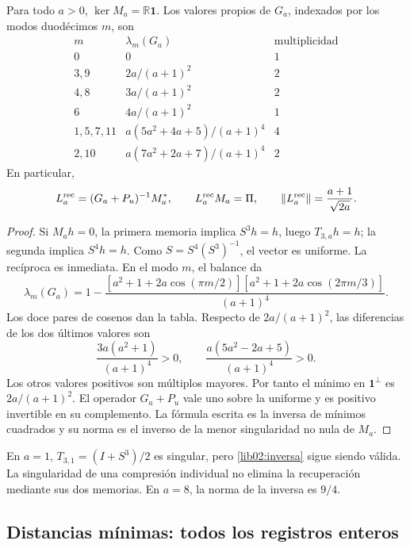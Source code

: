 \begin{theorem}
\label{lib02:inversa-memorias}
Para todo \(a>0\), \(\ker M_a=\mathbb R\mathbf1\). Los valores
propios de \(G_a\), indexados por los modos duodécimos \(m\), son
\[
\begin{array}{c|c|c}
 m&\lambda_m(G_a)&\text{multiplicidad}\\\hline
 0&0&1\\
 3,9&2a/(a+1)^2&2\\
 4,8&3a/(a+1)^2&2\\
 6&4a/(a+1)^2&1\\
 1,5,7,11&a(5a^2+4a+5)/(a+1)^4&4\\
 2,10&a(7a^2+2a+7)/(a+1)^4&2
\end{array}
\]
En particular,
\begin{equation}
 L_a^{\rm rec}=(G_a+P_u)^{-1}M_a^*,\qquad
 L_a^{\rm rec}M_a=\Pi,\qquad
 \|L_a^{\rm rec}\|=\frac{a+1}{\sqrt{2a}}.
 \label{lib02:inversa}
\end{equation}
\end{theorem}
\begin{proof}
Si \(M_ah=0\), la primera memoria implica \(S^3h=h\), luego
\(T_{3,a}h=h\); la segunda implica \(S^4h=h\). Como
\(S=S^4(S^3)^{-1}\), el vector es uniforme. La recíproca es
inmediata. En el modo \(m\), el balance da
\[
 \lambda_m(G_a)=1-
 \frac{[a^2+1+2a\cos(\pi m/2)]
 [a^2+1+2a\cos(2\pi m/3)]}{(a+1)^4}.
\]
Los doce pares de cosenos dan la tabla. Respecto de
\(2a/(a+1)^2\), las diferencias de los dos últimos valores son
\[
 \frac{3a(a^2+1)}{(a+1)^4}>0,\qquad
 \frac{a(5a^2-2a+5)}{(a+1)^4}>0.
\]
Los otros valores positivos son múltiplos mayores. Por tanto el mínimo
en \(\mathbf1^\perp\) es \(2a/(a+1)^2\). El operador
\(G_a+P_u\) vale uno sobre la uniforme y es positivo invertible en
su complemento. La fórmula escrita es la inversa de mínimos cuadrados
y su norma es el inverso de la menor singularidad no nula de \(M_a\).
\end{proof}

En \(a=1\), \(T_{3,1}=(I+S^3)/2\) es singular, pero
\eqref{lib02:inversa} sigue siendo válida. La singularidad de una
compresión individual no elimina la recuperación mediante sus dos
memorias. En \(a=8\), la norma de la inversa es \(9/4\).

\subsection{Distancias mínimas: todos los registros enteros}
\label{lib02:redes}

